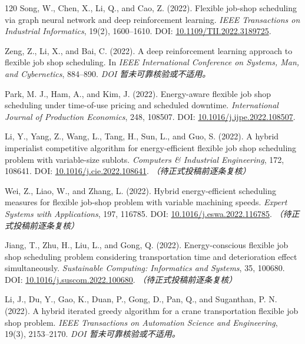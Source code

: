 \documentclass[UTF8,a4paper,11pt]{ctexart}
\begin{document}
\begin{thebibliography}{120}
Song, W., Chen, X., Li, Q., and Cao, Z. (2022). Flexible job-shop scheduling via graph neural network and deep reinforcement learning. \emph{IEEE Transactions on Industrial Informatics}, 19(2), 1600--1610.
\newblock DOI: \href{https://doi.org/10.1109/TII.2022.3189725}{10.1109/TII.2022.3189725}.

Zeng, Z., Li, X., and Bai, C. (2022). A deep reinforcement learning approach to flexible job shop scheduling. In \emph{IEEE International Conference on Systems, Man, and Cybernetics}, 884--890.
\newblock \textit{DOI 暂未可靠核验或不适用。}

Park, M. J., Ham, A., and Kim, J. (2022). Energy-aware flexible job shop scheduling under time-of-use pricing and scheduled downtime. \emph{International Journal of Production Economics}, 248, 108507.
\newblock DOI: \href{https://doi.org/10.1016/j.ijpe.2022.108507}{10.1016/j.ijpe.2022.108507}.

Li, Y., Yang, Z., Wang, L., Tang, H., Sun, L., and Guo, S. (2022). A hybrid imperialist competitive algorithm for energy-efficient flexible job shop scheduling problem with variable-size sublots. \emph{Computers \& Industrial Engineering}, 172, 108641.
\newblock DOI: \href{https://doi.org/10.1016/j.cie.2022.108641}{10.1016/j.cie.2022.108641}. \textit{（待正式投稿前逐条复核）}

Wei, Z., Liao, W., and Zhang, L. (2022). Hybrid energy-efficient scheduling measures for flexible job-shop problem with variable machining speeds. \emph{Expert Systems with Applications}, 197, 116785.
\newblock DOI: \href{https://doi.org/10.1016/j.eswa.2022.116785}{10.1016/j.eswa.2022.116785}. \textit{（待正式投稿前逐条复核）}

Jiang, T., Zhu, H., Liu, L., and Gong, Q. (2022). Energy-conscious flexible job shop scheduling problem considering transportation time and deterioration effect simultaneously. \emph{Sustainable Computing: Informatics and Systems}, 35, 100680.
\newblock DOI: \href{https://doi.org/10.1016/j.suscom.2022.100680}{10.1016/j.suscom.2022.100680}. \textit{（待正式投稿前逐条复核）}

Li, J., Du, Y., Gao, K., Duan, P., Gong, D., Pan, Q., and Suganthan, P. N. (2022). A hybrid iterated greedy algorithm for a crane transportation flexible job shop problem. \emph{IEEE Transactions on Automation Science and Engineering}, 19(3), 2153--2170.
\newblock \textit{DOI 暂未可靠核验或不适用。}


\end{thebibliography}
\end{document}
